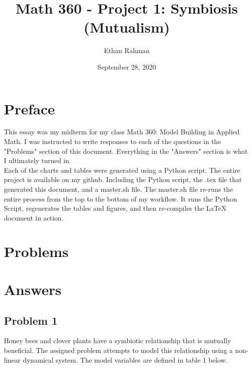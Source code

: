 \documentclass[12pt,a4paper,titlepage]{report}
\date{September 28, 2020}
\title{Math 360 - Project 1: Symbiosis (Mutualism)}
\author{Ethan Rahman}
\begin{document}
	\maketitle
	\tableofcontents
	\pagebreak
	\chapter*{Preface}
	This essay was my midterm for my class Math 360: Model Building in Applied Math. I was instructed to write responses to each of the questions in the "Problems" section of this document. Everything in the "Answers" section is what I ultimately turned in. \\
	
	Each of the charts and tables were generated using a Python script. The entire project is available on my github. Including the Python script, the .tex file that generated this document, and a master.sh file. The master.sh file re-runs the entire process from the top to the bottom of my workflow. It runs the Python Script, regenerates the tables and figures, and then re-compiles the LaTeX document in action. 
	\pagebreak
	\chapter*{Problems}
	
	\chapter*{Answers}
	
	\section*{Problem 1}
		Honey bees and clover plants have a symbiotic relationship that is mutually beneficial. The assigned problem attempts to model this relationship using a non-linear dynamical system. The model variables are defined in table 1 below.
	
\end{document}
